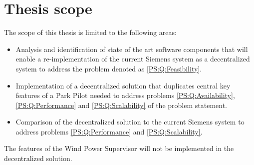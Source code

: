 \section{Thesis scope}
\label{sec:thesisScope}
The scope of this thesis is limited to the following areas:

\begin{itemize}
	\item Analysis and identification of state of the art software components that will enable a re-implementation of the current Siemens system as a decentralized system to address the problem denoted as \ref{PS:Q:Feasibility}.
	\item Implementation of a decentralized solution that duplicates central key features of a Park Pilot needed to address problems \ref{PS:Q:Availability}, \ref{PS:Q:Performance} and \ref{PS:Q:Scalability} of the problem statement.
	\item Comparison of the decentralized solution to the current Siemens system to address problems \ref{PS:Q:Performance} and \ref{PS:Q:Scalability}.
\end{itemize}

The features of the Wind Power Supervisor will not be implemented in the decentralized solution.


